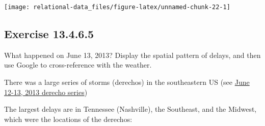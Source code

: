 \documentclass[]{book}
\newenvironment{Shaded}{\begin{snugshade}}{\end{snugshade}}
\newcommand{\DataTypeTok}[1]{\textcolor[rgb]{0.13,0.29,0.53}{#1}}
\newcommand{\KeywordTok}[1]{\textcolor[rgb]{0.13,0.29,0.53}{\textbf{#1}}}
\newcommand{\NormalTok}[1]{#1}
\newcommand{\OperatorTok}[1]{\textcolor[rgb]{0.81,0.36,0.00}{\textbf{#1}}}
\newcommand{\OtherTok}[1]{\textcolor[rgb]{0.56,0.35,0.01}{#1}}
\newcommand{\StringTok}[1]{\textcolor[rgb]{0.31,0.60,0.02}{#1}}
\theoremstyle{plain}
\theoremstyle{remark}
\begin{document}
\begin{Shaded}
\end{Shaded}

\begin{center}\texttt{[image: relational-data\_files/figure-latex/unnamed-chunk-22-1]} \end{center}

\hypertarget{exercise-13.4.6.5}{%
\subsection*{\texorpdfstring{Exercise
{13.4.6.5}}{Exercise 13.4.6.5}}\label{exercise-13.4.6.5}}

What happened on June 13, 2013? Display the spatial pattern of delays,
and then use Google to cross-reference with the weather.

There was a large series of storms (derechos) in the southeastern US
(see
\href{https://en.wikipedia.org/wiki/June_12\%E2\%80\%9313,_2013_derecho_series}{June
12-13, 2013 derecho series})

The largest delays are in Tennessee (Nashville), the Southeast, and the
Midwest, which were the locations of the derechos:
\end{document}
